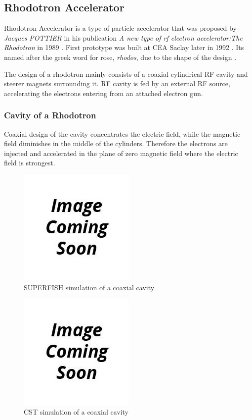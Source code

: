 \documentclass{article}
\begin{document}
\subsection{Rhodotron Accelerator}

Rhodotron Accelerator is a type of particle accelerator that was proposed by \textit{Jacques POTTIER} in his publication \textit{A new type of rf electron accelerator:The Rhodotron} in 1989 \cite{rhodo_pottier}. 
First prototype was built at CEA Saclay later in 1992 \cite{rhodo_prototype}. Its named after the greek word for rose, \textit{rhodos}, due to the shape of the design \cite{rhodos}.

The design of a rhodotron mainly consists of a coaxial cylindrical RF cavity and steerer magnets surrounding it. RF cavity is fed by an external RF source, accelerating the electrons entering from an attached electron gun.

\subsubsection{Cavity of a Rhodotron} \label{sec:cavity_of_a_rhodotron}

Coaxial design of the cavity concentrates the electric field, while the magnetic field diminishes in the middle of the cylinders. 
Therefore the electrons are injected and accelerated in the plane of zero magnetic field where the electric field is strongest.

\begin{figure}[H]
    \centering
    \includegraphics[scale=0.75]{../../../figures/to_be_added.png}
    \caption{SUPERFISH simulation of a coaxial cavity}
\end{figure}

\begin{figure}[H]
    \centering
    \includegraphics[scale=0.75]{../../../figures/to_be_added.png}
    \caption{CST simulation of a coaxial cavity}
\end{figure}
\end{document}
